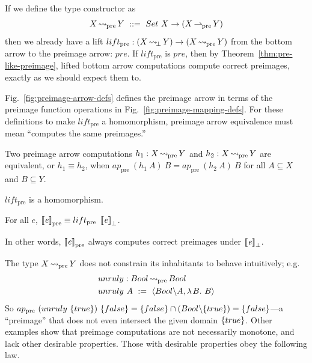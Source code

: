 \documentclass{llncs}
\newcommand{\figref}[1]{Fig.~\ref{#1}}
\newcommand{\arrow}{\rightsquigarrow}
\newcommand{\pto}{\rightharpoonup}
\newcommand{\pre}{_\mathrm{pre}}
\DeclareMathOperator{\botto}{{\arrow\mspace{-3mu}}_\bot}
\DeclareMathOperator{\preto}{{\arrow\mspace{-1mu}}\pre}
\DeclareMathOperator{\prepto}{{\pto\mspace{-1mu}}\pre}
\begin{document}
If we define the  type constructor as
\begin{equation}
	X \preto Y \ ::= \ Set~X \to (X \prepto Y)
\end{equation}
then we already have a lift $lift\pre : (X \botto Y) \to (X \preto Y)$ from the bottom arrow to the preimage arrow: $pre$.
If $lift\pre$ is $pre$, then by Theorem~\ref{thm:pre-like-preimage}, lifted bottom arrow computations compute correct preimages, exactly as we should expect them to.

\figref{fig:preimage-arrow-defs} defines the preimage arrow in terms of the preimage function operations in \figref{fig:preimage-mapping-defs}.
For these definitions to make $lift\pre$ a homomorphism, preimage arrow equivalence must mean ``computes the same preimages.''

\begin{definition}
Two preimage arrow computations $h_1 : X \preto Y$ and $h_2 : X \preto Y$ are equivalent, or $h_1 \equiv h_2$, when 
$ap\pre~(h_1~A)~B = ap\pre~(h_2~A)~B$ for all $A \subseteq X$ and $B \subseteq Y$.
\end{definition}

\begin{theorem}
$lift\pre$ is a homomorphism.
\end{theorem}

\begin{corollary}
\label{cor:preimage-arrow-correctness}
For all $\mathit{e}$, $\meaningof{\mathit{e}}\pre \equiv lift\pre~\meaningof{\mathit{e}}_\bot$.
\end{corollary}

In other words, $\meaningof{\mathit{e}}\pre$ always computes correct preimages under $\left\llbracket{\mathit{e}}\right\rrbracket_\bot$.

The type $X \preto Y$ does not constrain its inhabitants to behave intuitively; e.g.
\begin{equation}
\begin{aligned}
	&unruly : Bool \preto Bool \\
	&unruly~A \ := \ \pair{Bool \w A, \fun{B} B}
\end{aligned}
\end{equation}
So $ap\pre~(unruly~\set{true})~\set{false} = \set{false} \i (Bool \w \set{true}) = \set{false}$---a ``preimage'' that does not even intersect the given domain $\{{true}\}$.
Other examples show that preimage computations are not necessarily monotone, and lack other desirable properties.
Those with desirable properties obey the following law.
\end{document}
